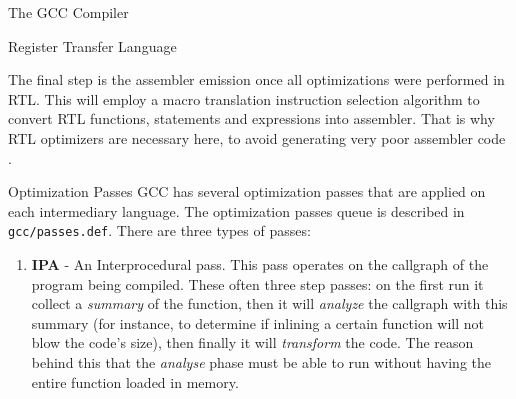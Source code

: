 \begin{section}{The GCC Compiler}
\begin{subsection}{Register Transfer Language}

	The final step is the assembler emission once all optimizations were
	performed in RTL. This will employ a macro translation instruction
	selection algorithm to convert RTL functions, statements and expressions
	into assembler. That is why RTL optimizers are necessary here, to avoid
	generating very poor assembler code \citep{gcc_insns_selection}.

%


\end{subsection}

\begin{subsection}{Optimization Passes}
	GCC has several optimization passes that are applied on each intermediary
	language. The optimization passes queue is described in
	\texttt{gcc/passes.def}. There are three types of passes:

    \begin{enumerate}
        \item \textbf{IPA} - An Interprocedural pass. This pass operates on the
		callgraph of the program being compiled. These often three step passes:
		on the first run it collect a \textit{summary} of the function, then
		it will \textit{analyze} the callgraph with this summary (for instance,
		to determine if inlining a certain function will not blow the code's size),
		then finally it will \textit{transform} the code. The reason behind this
		that the \textit{analyse} phase must be able to run without having the
		entire function loaded in memory.


\end{enumerate}
\end{subsection}
\end{section}
